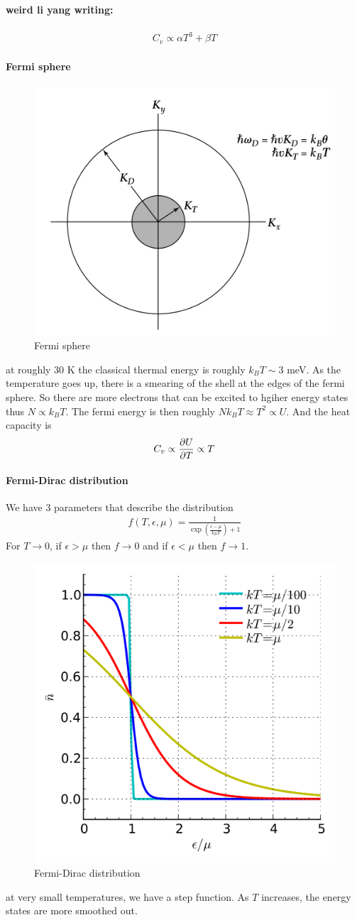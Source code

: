 \documentclass[../main.tex]{subfiles}
\begin{document}
\paragraph*{weird li yang writing:}
\begin{align*}
    C_v \propto \alpha T^3 + \beta T
\end{align*}

\paragraph*{Fermi sphere}
\begin{figure}[ht]
    \centering
    \includegraphics[width=0.4\linewidth]{debyelaw.png}
    \caption{Fermi sphere}
    \label{fig:6.1}
\end{figure}
at roughly 30 K the classical thermal energy is roughly $k_B T \sim 3$ meV. As the temperature goes
up, there is a smearing of the shell at the edges of the fermi sphere. So there are more electrons
that can be excited to hgiher energy states thus $N \propto k_B T$. The fermi energy is then roughly
$N k_B T \approx T^2 \propto U$. And the heat capacity is
\begin{align*}
    C_v \propto \pdv{U}{T} \propto T
\end{align*}

\paragraph*{Fermi-Dirac distribution} We have 3 parameters that describe the distribution
\begin{align*}
    f(T, \epsilon, \mu) = \frac{1}{\exp(\frac{\epsilon - \mu}{k_B T}) + 1}
\end{align*}
For $T\to 0$, if $\epsilon > \mu$ then $f \to 0$ and if $\epsilon < \mu$ then $f \to 1$. 
\begin{figure}[ht]
    \centering
    \includegraphics[width=0.4\linewidth]{fermi_dirac_dist.png}
    \caption{Fermi-Dirac distribution}
    \label{fig:6.2}
\end{figure}
at very small temperatures, we have a step function. As $T$ increases, the energy states
are more smoothed out.
\end{document}
